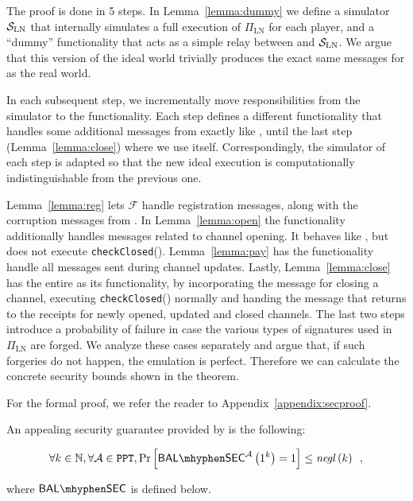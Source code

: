   \begin{proofsketch}
    The proof is done in 5 steps. In Lemma~\ref{lemma:dummy} we define a
    simulator $\mathcal{S}_{\mathrm{LN}}$ that internally simulates a full
    execution of $\Pi_{\mathrm{LN}}$ for each player, and a ``dummy''
    functionality that acts as a simple relay between \environment{} and
    $\mathcal{S}_{\mathrm{LN}}$. We argue that this version of the ideal world
    trivially produces the exact same messages for \environment{} as the real
    world.

    In each subsequent step, we incrementally move responsibilities from the
    simulator to the functionality. Each step defines a different functionality
    that handles some additional messages from \environment{} exactly like
    \fpaynet, until the last step (Lemma~\ref{lemma:close}) where we use
    \fpaynet{} itself. Correspondingly, the simulator of each step is adapted so
    that the new ideal execution is computationally indistinguishable from the
    previous one.

    Lemma~\ref{lemma:reg} lets $\mathcal{F}$ handle registration messages,
    along with the corruption messages from \simulator. In Lemma~\ref{lemma:open}
    the functionality additionally handles messages related to channel opening. It
    behaves like \fpaynet, but does not execute \texttt{checkClosed}().
    Lemma~\ref{lemma:pay} has the functionality handle all messages sent during
    channel updates. Lastly, Lemma~\ref{lemma:close} has the entire \fpaynet{} as
    its functionality, by incorporating the message for closing a channel,
    executing \texttt{checkClosed}() normally and handing the message that returns
    to \environment{} the receipts for newly opened, updated and closed
    channels. The last two steps introduce a probability of failure in case
    the various types of signatures used in  $\Pi_{\mathrm{LN}}$ are forged. We analyze these cases separately and argue that, if
    such forgeries do not happen, the emulation is perfect. Therefore we can
    calculate the concrete security bounds shown in the theorem.
  \end{proofsketch}
  For the formal proof, we refer the reader to Appendix~\ref{appendix:secproof}.

  An appealing security guarantee provided by \fpaynet{} is the following:
  \begin{corollary}
    \begin{equation*}
      \forall k \in \mathbb{N}, \forall \adversary{} \in \mathtt{PPT},
      \Pr\left[\mathsf{BAL \mhyphen SEC}^{\adversary}\left(1^k\right) = 1\right]
      \leq \mathit{negl}\left(k\right) \enspace,
    \end{equation*}
  \end{corollary}
  where $\mathsf{BAL \mhyphen SEC}$ is defined below. %

